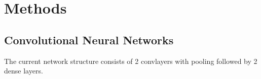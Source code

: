 \documentclass[main.tex]{subfiles}
\begin{document}
\chapter{Methods}
\section{Convolutional Neural Networks}
The current network structure consists of 2 convlayers with pooling
followed by 2 dense layers.
\end{document}
